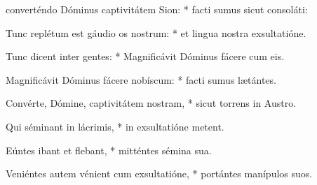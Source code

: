\begin{psalmus}
    
     converténdo Dóminus captivitátem Sion: * facti sumus sicut consoláti:
    
    Tunc replétum est gáudio os nostrum: * et lingua nostra exsultatióne.
    
    Tunc dicent inter gentes: * Magnificávit Dóminus fácere cum eis.
    
    Magnificávit Dóminus fácere nobíscum: * facti sumus lætántes.
    
    Convérte, Dómine, captivitátem nostram, * sicut torrens in Austro.
    
    Qui séminant in lácrimis, * in exsultatióne metent.
    
    Eúntes ibant et flebant, * mitténtes sémina sua.
    
    Veniéntes autem vénient cum exsultatióne, * portántes manípulos suos.
    
    \end{psalmus}

